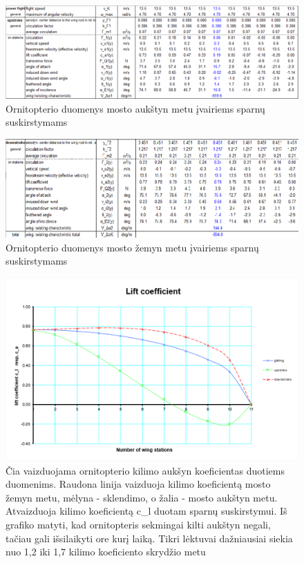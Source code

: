 \documentclass{VUMIFPSkursinis}
\begin{document}
\begin{figure}[h]
	\caption{Ornitopterio duomenys mosto aukštyn metu įvairiems sparnų suskirstymams}
	\centering
	\includegraphics[scale=0.9]{img/upstroke}
\end{figure}

\begin{figure}[h]
	\caption{Ornitopterio duomenys mosto žemyn metu įvairiems sparnų suskirstymams}
	\centering
	\includegraphics{img/downstroke}
\end{figure}

\begin{figure}[h]
	\caption{Čia vaizduojama ornitopterio kilimo aukšyn koeficientas duotiems duomenims. Raudona linija vaizduoja kilimo koeficientą mosto žemyn metu, mėlyna - sklendimo, o žalia - mosto aukštyn metu. Atvaizduoja kilimo koeficientą c\_l duotam sparnų suskirstymui. Iš grafiko matyti, kad ornitopteris sekmingai kilti aukštyn negali, tačiau gali išsilaikyti ore kurį laiką. Tikri lėktuvai dažniausiai siekia nuo 1,2 iki 1,7 kilimo koeficiento skrydžio metu}
	\centering
	\includegraphics{img/pav1} 
\end{figure}
\end{document}
